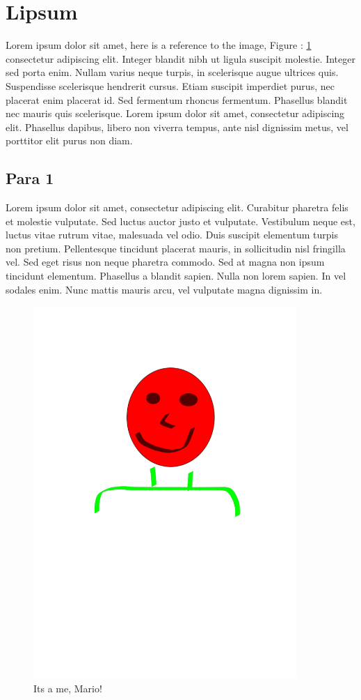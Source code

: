 \documentclass[a4paper]{article}
\begin{document}
\section{Lipsum}
Lorem ipsum dolor sit amet, here is a reference to the image, Figure : \ref{figure:mario} consectetur adipiscing elit. Integer blandit nibh ut ligula suscipit molestie. Integer sed porta enim. Nullam varius neque turpis, in scelerisque augue ultrices quis. Suspendisse scelerisque hendrerit cursus. Etiam suscipit imperdiet purus, nec placerat enim placerat id. Sed fermentum rhoncus fermentum. Phasellus blandit nec mauris quis scelerisque. Lorem ipsum dolor sit amet, consectetur adipiscing elit. Phasellus dapibus, libero non viverra tempus, ante nisl dignissim metus, vel porttitor elit purus non diam.
\subsection{Para 1}
Lorem ipsum dolor sit amet, consectetur adipiscing elit. Curabitur pharetra felis et molestie vulputate. Sed luctus auctor justo et vulputate. Vestibulum neque est, luctus vitae rutrum vitae, malesuada vel odio. Duis suscipit elementum turpis non pretium. Pellentesque tincidunt placerat mauris, in sollicitudin nisl fringilla vel. Sed eget risus non neque pharetra commodo. Sed at magna non ipsum tincidunt elementum. Phasellus a blandit sapien. Nulla non lorem sapien. In vel sodales enim. Nunc mattis mauris arcu, vel vulputate magna dignissim in.
\begin{figure}
\centerline{\includegraphics[width=10cm]{portrait.pdf}}
\caption{Its a me, Mario!}
\label{figure:mario}
\end{figure}
\end{document}
